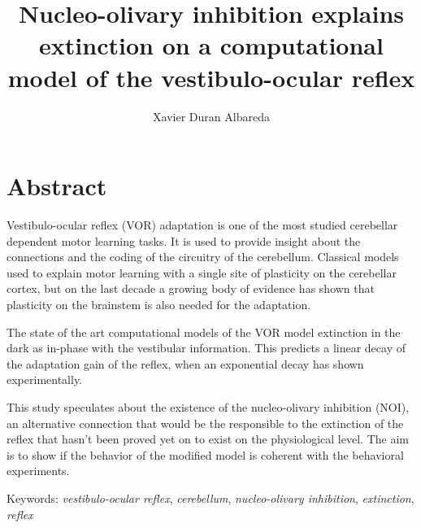 \documentclass[12pt, a4paper,twoside]{tesi_upf}
\title{Nucleo-olivary inhibition explains extinction on a computational model of the vestibulo-ocular reflex}
\author{Xavier Duran Albareda}
\newcommand{\keyword}[1]{\textit{#1}}
\begin{document}
\frontmatter

\maketitle

\cleardoublepage




\vspace*{\fill}
\section*{\Large \sffamily  Abstract}

Vestibulo-ocular reflex (VOR) adaptation is one of the most studied cerebellar dependent motor learning tasks. It is used to provide insight about the connections and the coding of the circuitry of the cerebellum. Classical models used to explain motor learning with a single site of plasticity on the cerebellar cortex, but on the last decade a growing body of evidence has shown that plasticity on the brainstem is also needed for the adaptation.

The state of the art computational models of the VOR model extinction in the dark as in-phase with the vestibular information. This predicts a linear decay of the adaptation gain of the reflex, when an exponential decay has shown experimentally.

This study speculates about the existence of the nucleo-olivary inhibition (NOI), an alternative connection that would be the responsible to the extinction of the reflex that hasn't been proved yet on to exist on the physiological level. The aim is to show if the behavior of the modified model is coherent with the behavioral experiments.

\vskip 1cm

Keywords: \keyword{vestibulo-ocular reflex}, \keyword{cerebellum}, \keyword{nucleo-olivary inhibition}, \keyword{extinction}, \keyword{reflex}

\vspace*{\fill}

\cleardoublepage

\cleardoublepage
\end{document}
